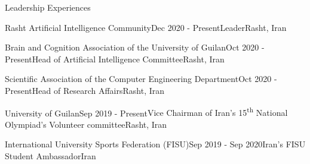 \documentclass{resume} %
\begin{document}
\begin{rSection}{Leadership Experiences}

\begin{rSubsection}{Rasht Artificial Intelligence Community}{Dec 2020 - Present}{Leader}{Rasht, Iran}
\end{rSubsection}

\begin{rSubsection}{Brain and Cognition Association of the University of Guilan}{Oct 2020 - Present}{Head of Artificial Intelligence Committee}{Rasht, Iran}
\end{rSubsection}

\begin{rSubsection}{Scientific Association of the Computer Engineering Department}{Oct 2020 - Present}{Head of Research Affairs}{Rasht, Iran}
\end{rSubsection}

\begin{rSubsection}{University of Guilan}{Sep 2019 - Present}{Vice Chairman of Iran's 15\textsuperscript{th} National Olympiad's Volunteer committee}{Rasht, Iran}
\end{rSubsection}

\begin{rSubsection}{International University Sports Federation (FISU)}{Sep 2019 - Sep 2020}{Iran's FISU Student Ambassador}{Iran}
\end{rSubsection}

\end{rSection}
\end{document}
